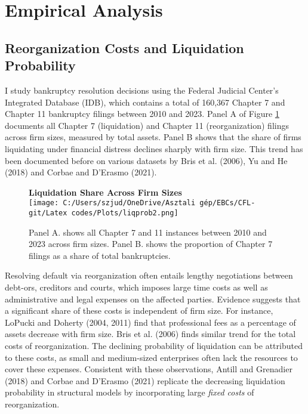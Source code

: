 \documentclass[12pt]{article}
\begin{document}
\section{Empirical Analysis \label{sec:empirical analysis}}

\subsection{Reorganization Costs and Liquidation Probability \label{sec:emp liqprob}} 

I study bankruptcy resolution decisions using the Federal Judicial Center's Integrated Database (IDB), which contains a total of 160,367 Chapter 7 and Chapter 11 bankruptcy filings between 2010 and 2023. Panel A of Figure \ref{chart:liqprob_emp} documents all Chapter 7 (liquidation) and Chapter 11 (reorganization) filings across firm sizes, measured by total assets. Panel B shows that the share of firms liquidating under financial distress declines sharply with firm size.  This trend has been documented before on various datasets by Bris et al. (2006), Yu and He (2018) and Corbae and D'Erasmo (2021). 

\begin{figure}[H]  %
    \centering  
    \textbf{\large Liquidation Share Across Firm Sizes \vspace{2mm} } \\  %
    \texttt{[image: C:/Users/szjud/OneDrive/Asztali gép/EBCs/CFL-git/Latex codes/Plots/liqprob2.png]}
    \caption{ \small Panel A. shows all Chapter 7 and 11 instances between 2010 and 2023 across firm sizes. Panel B. shows the proportion of Chapter 7 filings as a share of total bankruptcies.}
    \label{chart:liqprob_emp}
\end{figure}

\noindent Resolving default via reorganization often entails lengthy negotiations between debt-ors, creditors and courts, which imposes large time costs as well as administrative and legal expenses on the affected parties. Evidence suggests that a significant share of these costs is independent of firm size. For instance, LoPucki and Doherty (2004, 2011) find that professional fees as a percentage of assets decrease with firm size. Bris et al. (2006) finds similar trend for the total costs of reorganization. The declining probability of liquidation can be attributed to these costs, as small and medium-sized enterprises often lack the resources to cover these expenses. Consistent with these observations, Antill and Grenadier (2018) and Corbae and D'Erasmo (2021) replicate the decreasing liquidation probability in structural models by incorporating large \textit{fixed costs} of reorganization.
\end{document}
